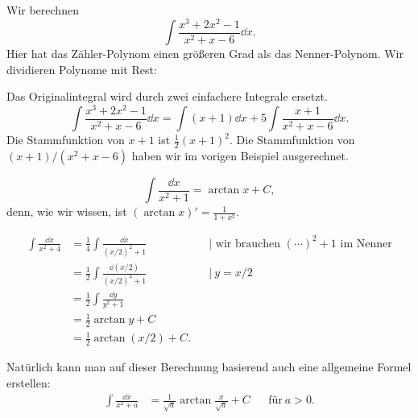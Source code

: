 \begin{bsp}
	Wir berechnen
	\[
	\int \frac{x^3 + 2 x^2 - 1}{x^2 + x -6} \dd x.
	\]
	Hier hat das Zähler-Polynom einen größeren Grad als das Nenner-Polynom. Wir dividieren Polynome mit Rest: 
	\begin{center}
	\end{center}
	Das Originalintegral wird durch zwei einfachere Integrale ersetzt. 
	\[
	\int \frac{x^3 + 2 x^2 - 1}{x^2 + x -6} \dd x = \int (x+1) \dd x + 5 \int \frac{x+1}{x^2 + x-6} \dd x. 
	\]
	Die Stammfunktion von $x+1$ ist $\frac{1}{2} (x+1)^2$. Die Stammfunktion von 
	\( (x+1) / (x^2 + x - 6) \) haben wir im vorigen Beispiel ausgerechnet. 
\end{bsp} 

\begin{bsp} 
	\[
	\int \frac{\dd x}{x^2+ 1} = \arctan x + C,
	\]
	denn, wie wir wissen, ist $(\arctan x)' = \frac{1}{1+x^2}$. 
\end{bsp} 

\begin{bsp} 
	\begin{align*}
	\int \frac{\dd x}{x^2 + 4} & = \frac{1}{4} \int \frac{\dd x}{ (x/2)^2 + 1}  & & |\text{ wir brauchen $(\cdots )^2 + 1$ im Nenner}
	\\ & = \frac{1}{2} \int \frac{\dd (x/2) }{ (x/2)^2 + 1} & & | \ y=x/2 
	\\ & = \frac{1}{2} \int \frac{\dd y}{y^2 + 1} 
	\\ & =  \frac{1}{2} \arctan y + C
	\\ & = \frac{1}{2} \arctan (x/2) + C. 
	\end{align*}
	
	Natürlich kann man auf dieser Berechnung basierend auch eine allgemeine Formel erstellen: 
	\begin{align*}
	\int \frac{\dd x}{x^2 + a} & = \frac{1}{\sqrt{a}} \arctan \frac{x}{\sqrt{a}} + C & & \text{für} \ a > 0.
	\end{align*}
\end{bsp} 

